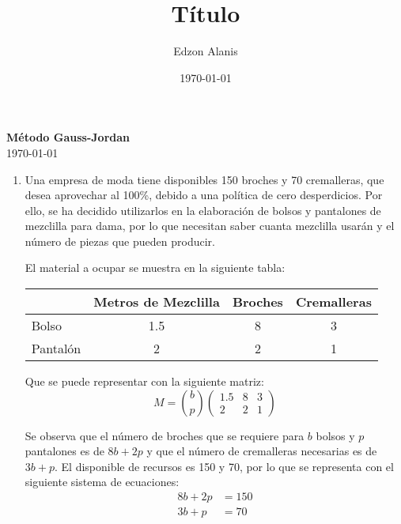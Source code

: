 \documentclass[12pt]{article}
\title{Título}
\author{Edzon Alanis}
\date{\today}
\begin{document}

\begin{center}
    \textbf{\Large Método Gauss-Jordan}\\[0.5cm]
    \today
\end{center}

\begin{enumerate}
    \item Una empresa de moda tiene disponibles 150 broches y 70 cremalleras, que desea aprovechar al 100\%, debido a una política de cero desperdicios. Por ello, se ha decidido utilizarlos en la elaboración de bolsos y pantalones de mezclilla para dama, por lo que necesitan saber cuanta mezclilla usarán y el número de piezas que pueden producir.
    
    El material a ocupar se muestra en la siguiente tabla: 
    \begin{table}[H]
        \centering
        \begin{tabular}{c|c|c|c|}
        \cline{2-4}
                                    & Metros de Mezclilla & Broches & Cremalleras \\ \hline
        \multicolumn{1}{|l|}{Bolso}    & 1.5                 & 8       & 3           \\ \hline
        \multicolumn{1}{|l|}{Pantalón} & 2                   & 2       & 1           \\ \hline
        \end{tabular}
    \end{table}

    Que se puede representar con la siguiente matriz:
    \[M = \binom{b}{p} \begin{pmatrix}
        1.5 & 8 & 3 \\
        2 & 2 & 1
    \end{pmatrix}\]

    Se observa que el número de broches que se requiere para $b$ bolsos y $p$ pantalones es de $8b+2p$ y que el número de cremalleras necesarias es de $3b+p$. El disponible de recursos es 150 y 70, por lo que se representa con el siguiente sistema de ecuaciones:
    \begin{align*}
        8b + 2p &= 150 \\
        3b + p &= 70
    \end{align*}


\end{enumerate}
\end{document}
